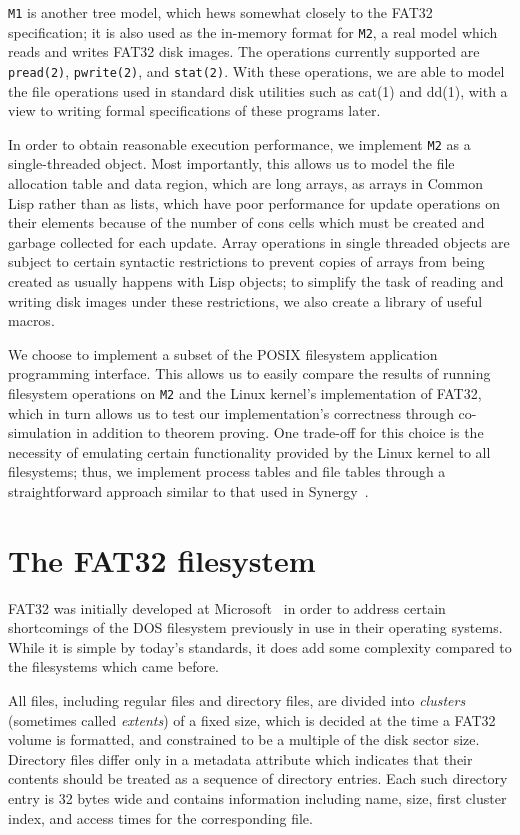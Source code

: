 \documentclass[submission,copyright,creativecommons]{eptcs}
\begin{document}
\texttt{M1} is another tree model, which hews somewhat closely to the
FAT32 specification; it is also used as the in-memory format for
\texttt{M2}, a real model which reads and writes FAT32 disk
images. The operations currently supported are \texttt{pread(2)},
\texttt{pwrite(2)}, and \texttt{stat(2)}. With these operations, we
are able to model the file operations used in standard disk utilities
such as cat(1) and dd(1), with a view to writing formal specifications
of these programs later.

In order to obtain reasonable execution performance, we implement
\texttt{M2} as a single-threaded object. Most importantly, this allows
us to model the file allocation table and data region, which are long
arrays, as arrays in Common Lisp rather than as lists, which have poor
performance for update operations on their elements because of the
number of cons cells which must be created and garbage collected for
each update. Array operations in single threaded objects are subject
to certain syntactic restrictions to prevent copies of arrays from
being created as usually happens with Lisp objects; to simplify the
task of reading and writing disk images under these restrictions, we
also create a library of useful macros.

We choose to implement a subset of the POSIX filesystem application
programming interface. This allows us to easily compare the results of
running filesystem operations on \texttt{M2} and the Linux kernel's
implementation of FAT32, which in turn allows us to test our
implementation's correctness through co-simulation in addition to
theorem proving. One trade-off for this choice is the necessity of
emulating certain functionality provided by the Linux kernel to all
filesystems; thus, we implement process tables and file tables through
a straightforward approach similar to that used in
Synergy~\cite{bevier1996executable}.

\section{The FAT32 filesystem}

FAT32 was initially developed at Microsoft~\cite{microsoft2000} in
order to address certain shortcomings of the DOS filesystem previously
in use in their operating systems. While it is simple by today's
standards, it does add some complexity compared to the filesystems
which came before.

All files, including regular files and directory files, are divided into
\textit{clusters} (sometimes called \textit{extents}) of a fixed size,
which is decided at the time a FAT32 volume is formatted, and
constrained to be a multiple of the disk sector size. Directory files
differ only in a metadata attribute which indicates that their contents
should be treated as a sequence of directory entries. Each such
directory entry is 32 bytes wide and contains information including
name, size, first cluster index, and access times for the
corresponding file.
\end{document}
